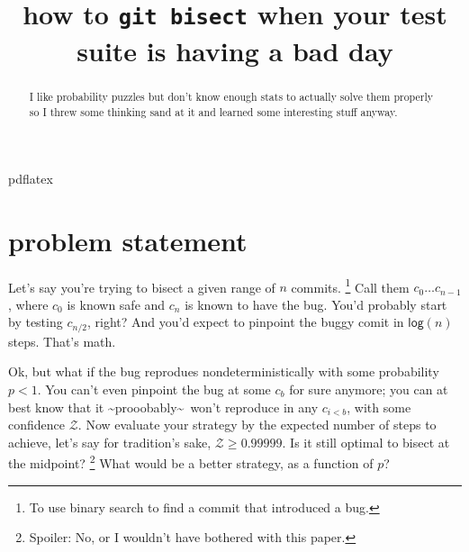 \documentclass[11pt]{sigplanconf}
\begin{document}
\copyrightdata{}

\title{
how to \texttt{git bisect} when your test suite is having a bad day
}


\maketitle

\begin{abstract}
	I like probability puzzles but don't know enough stats to actually solve them properly
	so I threw some thinking sand at it and learned some interesting stuff anyway.
\end{abstract}


\keywords pdflatex

\newcommand\confidents{\ensuremath{\mathcal{Z}}\xspace}
\newcommand\pdf{\ensuremath{\mathsf{pdf}}\xspace}
\newcommand\cdf{\ensuremath{\mathsf{cdf}}\xspace}

\section{problem statement}

Let's say you're trying to bisect
a given range of $n$ commits.%
\footnote{To use binary search to find a commit that introduced a bug.}
Call them $c_0 \dots c_{n-1}$, where $c_0$ is known safe and $c_n$ is known to have the bug.
You'd probably start by testing $c_{n/2}$, right?
And you'd expect to pinpoint the buggy comit in $\mathsf{log} (n)$ steps.
That's math.

Ok, but what if the bug reprodues nondeterministically with some probability $p<1$.
You can't even pinpoint the bug at some $c_{b}$ for sure anymore;
you can at best know
that it \textasciitilde{}prooobably\textasciitilde~won't reproduce in any $c_{i<b}$,
with some confidence $\confidents$.
Now evaluate your strategy by the expected number of steps to achieve, let's say for tradition's sake, $\confidents \ge 0.99999$.
Is it still optimal to bisect at the midpoint?%
\footnote{Spoiler: No, or I wouldn't have bothered with this paper.}
What would be a better strategy, as a function of $p$?
\end{document}
